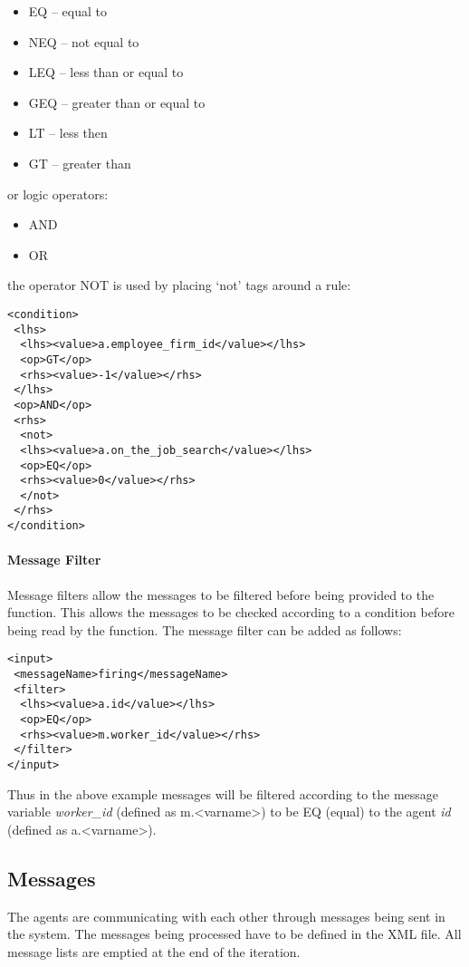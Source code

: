 \begin{itemize}
\item EQ -- equal to
\item NEQ -- not equal to
\item LEQ -- less than or equal to
\item GEQ -- greater than or equal to
\item LT -- less then
\item GT -- greater than
\end{itemize}
or logic operators:
\begin{itemize}
\item AND
\item OR
\end{itemize}
the operator NOT is used by placing `not' tags around a rule:
\begin{mylisting}
\begin{verbatim}
<condition>
 <lhs>
  <lhs><value>a.employee_firm_id</value></lhs>
  <op>GT</op>
  <rhs><value>-1</value></rhs>
 </lhs>
 <op>AND</op>
 <rhs>
  <not>
  <lhs><value>a.on_the_job_search</value></lhs>
  <op>EQ</op>
  <rhs><value>0</value></rhs>
  </not>
 </rhs>
</condition>
\end{verbatim}
\end{mylisting}

\paragraph{Message Filter}
Message filters allow the messages to be filtered before being
provided to the function. This allows the messages to be checked
according to a condition before being read by the function. The
message filter can be added as follows:

\begin{mylisting}
\begin{verbatim}
<input>
 <messageName>firing</messageName>
 <filter>
  <lhs><value>a.id</value></lhs>
  <op>EQ</op>
  <rhs><value>m.worker_id</value></rhs>
 </filter>
</input>
\end{verbatim}
\end{mylisting}

Thus in the above example messages will be filtered according to the
message variable \emph{worker\_id} (defined as m.<varname>) to be EQ
(equal) to the agent \emph{id} (defined as a.<varname>).

\subsection{Messages}
The agents are communicating with each other through messages being
sent in the system. The messages being processed have to be defined
in the XML file. All message lists are emptied at the end of the
iteration.

